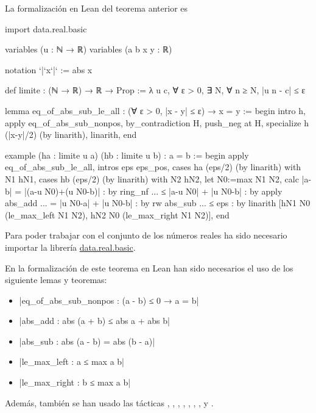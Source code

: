 La formalización en Lean del teorema anterior es
\begin{leancode}
import data.real.basic

variables (u : ℕ → ℝ)
variables (a b x y : ℝ)

notation `|`x`|` := abs x

def limite : (ℕ → ℝ) → ℝ → Prop :=
λ u c, ∀ ε > 0, ∃ N, ∀ n ≥ N, |u n - c| ≤ ε

lemma eq_of_abs_sub_le_all
  : (∀ ε > 0, |x - y| ≤ ε) → x = y :=
begin
  intro h,
  apply eq_of_abs_sub_nonpos,
  by_contradiction H,
  push_neg at H,
  specialize h (|x-y|/2) (by linarith),
  linarith,
end

example
  (ha : limite u a)
  (hb : limite u b)
  : a = b :=
begin
  apply eq_of_abs_sub_le_all,
  intros eps eps_pos,
  cases ha (eps/2) (by linarith) with N1 hN1,
  cases hb (eps/2) (by linarith) with N2 hN2,
  let N0:=max N1 N2,
  calc  |a-b|
      = |(a-u N0)+(u N0-b)| : by ring_nf
  ... ≤ |a-u N0| + |u N0-b| : by apply abs_add
  ... = |u N0-a| + |u N0-b| : by rw abs_sub
  ... ≤ eps                 : by linarith [hN1 N0 (le_max_left N1 N2),
                                           hN2 N0 (le_max_right N1 N2)],
end
\end{leancode}

Para poder trabajar con el conjunto de los números reales ha sido necesario
importar la librería \href{https://github.com/leanprover-community/mathlib/blob/master/src/data/real/basic.lean}
{data.real.basic}.

En la formalización de este teorema en Lean han sido necesarios el uso
de los siguiente lemas y teoremas:
\begin{itemize}
\item {}|eq_of_abs_sub_nonpos : (a - b) ≤ 0 → a = b|
\item {}|abs_add : abs (a + b) ≤ abs a + abs b|
\item {}|abs_sub : abs (a - b) = abs (b - a)|
\item {}|le_max_left : a ≤ max a b|
\item {}|le_max_right : b ≤ max a b|
\end{itemize}

Además, también se han usado las tácticas
,
,
\linebreak
{},
,
,
,
,
 y
.

